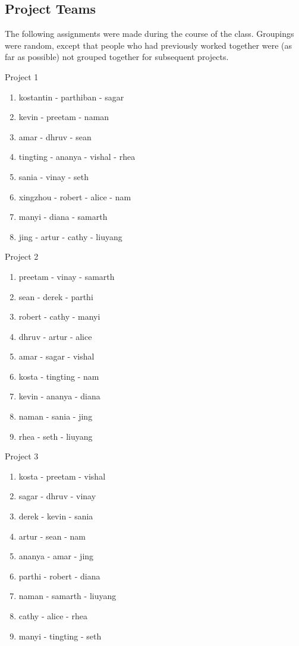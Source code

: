 \subsection{Project Teams}

The following assignments were made during the course of the class. Groupings were random, 
except that people who had previously worked together were (as far as possible) not 
grouped together for subsequent projects.

Project 1\\
\begin{enumerate}
\item kostantin - parthiban - sagar
\item kevin - preetam - naman
\item amar - dhruv - sean
\item tingting - ananya - vishal - rhea
\item sania - vinay - seth
\item xingzhou - robert - alice - nam
\item manyi - diana - samarth
\item jing - artur - cathy - liuyang
\end{enumerate}
Project 2\\
\begin{enumerate}
\item preetam - vinay - samarth
\item sean - derek - parthi
\item robert - cathy - manyi
\item dhruv - artur - alice
\item amar - sagar - vishal
\item kosta - tingting - nam
\item kevin - ananya - diana
\item naman - sania - jing
\item rhea - seth - liuyang
\end{enumerate}
Project 3\\
\begin{enumerate}
\item kosta - preetam - vishal
\item sagar - dhruv - vinay
\item derek - kevin - sania
\item artur - sean - nam
\item ananya - amar - jing
\item parthi - robert - diana
\item naman - samarth - liuyang
\item cathy - alice - rhea
\item manyi - tingting - seth
\end{enumerate}
